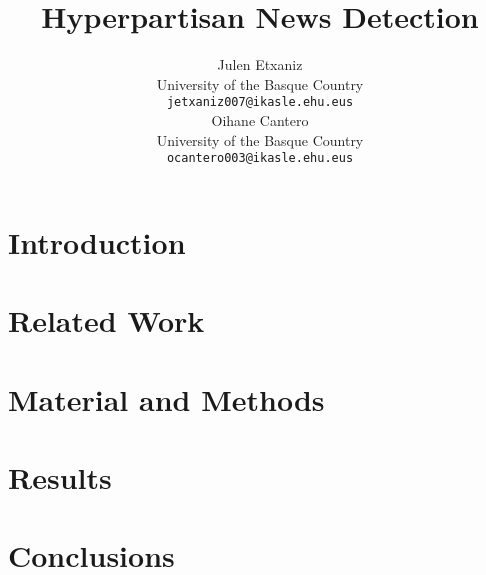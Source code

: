 \documentclass[11pt,a4paper]{article}
\title{Hyperpartisan News Detection}
\author{Julen Etxaniz \\
  University of the Basque Country \\
  \texttt{jetxaniz007@ikasle.ehu.eus} \\\And
  Oihane Cantero \\
  University of the Basque Country \\
  \texttt{ocantero003@ikasle.ehu.eus} \\}
\date{}
\begin{document}
\maketitle
\begin{abstract}

\end{abstract}

\section{Introduction}

\cite{kessler2017scattertext}

\cite{kiesel2019semeval}

\section{Related Work}

\section{Material and Methods}

\section{Results}

\section{Conclusions}



\end{document}
